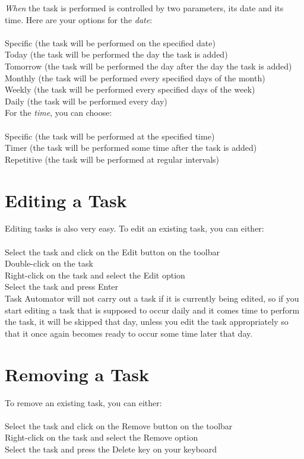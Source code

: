 \documentclass{article}
\begin{document}
\emph{When} the task is performed is controlled by two parameters, its date and its time. Here are your options for the \emph{date}:\\
\\
Specific (the task will be performed on the specified date)\\
Today (the task will be performed the day the task is added)\\
Tomorrow (the task will be performed the day after the day the task is added)\\
Monthly (the task will be performed every specified days of the month)\\
Weekly (the task will be performed every specified days of the week)\\
Daily (the task will be performed every day)\\

For the \emph{time}, you can choose:\\
\\
Specific (the task will be performed at the specified time)\\
Timer (the task will be performed some time after the task is added)\\
Repetitive (the task will be performed at regular intervals)\\

\section{Editing a Task}
Editing tasks is also very easy. To edit an existing task, you can either:\\
\\
Select the task and click on the Edit button on the toolbar\\
Double-click on the task\\
Right-click on the task and select the Edit option\\
Select the task and press Enter\\

Task Automator will not carry out a task if it is currently being edited, so if you start editing a task that is supposed to occur daily and it comes time to perform the task, it will be skipped that day, unless you edit the task appropriately so that it once again becomes ready to occur some time later that day.

\section{Removing a Task}
To remove an existing task, you can either:\\
\\
Select the task and click on the Remove button on the toolbar\\
Right-click on the task and select the Remove option\\
Select the task and press the Delete key on your keyboard
\pagebreak
\end{document}
